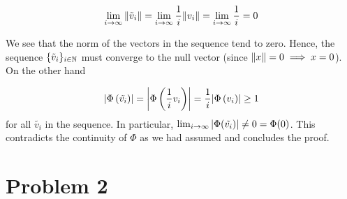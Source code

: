 \documentclass[12pt]{article}%
\newcommand{\normphi}[1][v]{\abs{\Phi\left({#1}
\right)}}
\begin{document}
\begin{enumerate}[i.]
  \[ \lim_{i \rightarrow \infty} \norm{\tilde{v}_i} = \lim_{i \rightarrow \infty} \frac{1}{i} \norm{v_i} =  \lim_{i \rightarrow \infty} \frac{1}{i}  = 0\]

  We see that the norm of the vectors in the sequence tend to zero. Hence, the sequence $\{\tilde{v}_i\}_{i \in \mathbb{N}}$ must converge to the null vector (since $\norm{x} = 0 \implies x = 0$). On the other hand

  \[ \normphi[\tilde{v_i}] = \normphi[\frac{1}{i} v_i] =  \frac{1}{i}\normphi[v_i] \geq 1 \] for all $\tilde{v_i}$ in the sequence. In particular, $\lim_{i \rightarrow \infty} \abs{\Phi(\tilde{v_i})} \neq 0 = \Phi(0)$. This contradicts the continuity of $\Phi$ as we had assumed and concludes the proof.
\end{enumerate}

\section*{Problem 2}
\end{document}
